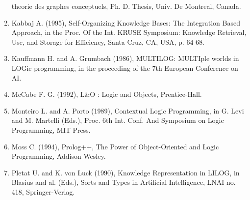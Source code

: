 \documentclass{book}
\begin{document}
\begin{enumerate}
theorie des graphes conceptuels, Ph. D. Thesis, Univ. De Montreal,
Canada.
\item Kabbaj A. (1995),
Self-Organizing Knowledge Bases: The Integration Based Approach,
in the Proc. Of the Int. KRUSE Symposium: Knowledge Retrieval,
Use, and Storage for Efficiency, Santa Cruz, CA, USA, p.
64-68.
\item Kauffmann H. and A. Grumbach
(1986), MULTILOG: MULTIple worlds in LOGic programming, in the
proceeding of the 7th European Conference on
AI.
\item McCabe F. G. (1992), L\&O :
Logic and Objects, Prentice-Hall.
\item Monteiro L. and A. Porto (1989),
Contextual Logic Programming, in G. Levi and M. Martelli (Eds.),
Proc. 6th Int. Conf. And Symposium on Logic Programming,
MIT Press.
\item Moss C. (1994), Prolog++, The
Power of Object-Oriented and Logic Programming,
Addison-Wesley.
\item Pletat U. and K. von Luck
(1990), Knowledge Representation in LILOG, in Blasius and al.
(Eds.), Sorts and Types in Artificial Intelligence, LNAI
no. 418, Springer-Verlag.
\end{enumerate}
\end{document}
